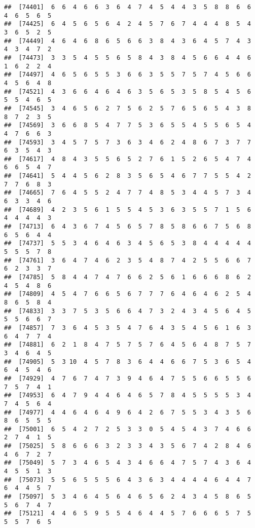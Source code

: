 \documentclass[
]{book}
\begin{document}
\begin{verbatim}
##  [74401]  6  6  4  6  6  3  6  4  7  4  5  4  4  3  5  8  8  6  6  4  6  5  6  5
##  [74425]  6  4  5  6  5  6  4  2  4  5  7  6  7  4  4  4  8  5  4  3  6  5  2  5
##  [74449]  4  6  4  6  8  6  5  6  6  3  8  4  3  6  4  5  7  4  3  4  3  4  7  2
##  [74473]  3  3  5  4  5  5  6  5  8  4  3  8  4  5  6  6  4  4  6  1  6  2  2  4
##  [74497]  4  6  5  6  5  5  3  6  6  3  5  5  7  5  7  4  5  6  6  4  5  6  4  8
##  [74521]  4  3  6  6  4  6  4  6  3  5  6  5  3  5  8  5  4  5  6  5  5  4  6  5
##  [74545]  3  4  6  5  6  2  7  5  6  2  5  7  6  5  6  5  4  3  8  8  7  2  3  5
##  [74569]  3  6  6  8  5  4  7  7  5  3  6  5  5  4  5  5  6  5  4  4  7  6  6  3
##  [74593]  3  4  5  7  5  7  3  6  3  4  6  2  4  8  6  7  3  7  7  6  3  5  4  3
##  [74617]  4  8  4  3  5  5  6  5  2  7  6  1  5  2  6  5  4  7  4  6  6  5  4  7
##  [74641]  5  4  4  5  6  2  8  3  5  6  5  4  6  7  7  5  5  4  2  7  7  6  8  3
##  [74665]  7  6  4  5  5  2  4  7  7  4  8  5  3  4  4  5  7  3  4  6  3  3  4  6
##  [74689]  4  2  3  5  6  1  5  5  4  5  3  6  3  5  5  7  1  5  6  4  4  4  4  3
##  [74713]  6  4  3  6  7  4  5  6  5  7  8  5  8  6  6  7  5  6  8  6  5  6  4  4
##  [74737]  5  5  3  4  6  4  6  3  4  5  6  5  3  8  4  4  4  4  4  5  5  5  7  8
##  [74761]  3  6  4  7  4  6  2  3  5  4  8  7  4  2  5  5  6  6  7  6  2  3  3  7
##  [74785]  5  8  4  4  7  4  7  6  6  2  5  6  1  6  6  6  8  6  2  4  5  4  8  6
##  [74809]  4  5  4  7  6  6  5  6  7  7  7  6  4  6  4  6  2  5  4  8  6  5  8  4
##  [74833]  3  3  7  5  3  5  6  6  4  7  3  2  4  3  4  5  6  4  5  5  5  6  6  7
##  [74857]  7  3  6  4  5  3  5  4  7  6  4  3  5  4  5  6  1  6  3  6  4  7  7  4
##  [74881]  6  2  1  8  4  7  5  7  5  7  6  4  5  6  4  8  7  5  7  3  4  6  4  5
##  [74905]  5  3 10  4  5  7  8  3  6  4  4  6  6  7  5  3  6  5  4  6  4  5  4  6
##  [74929]  4  7  6  7  4  7  3  9  4  6  4  7  5  5  6  6  5  5  6  7  5  7  4  1
##  [74953]  6  4  7  9  4  4  6  4  6  5  7  8  4  5  5  5  5  3  4  7  4  5  6  4
##  [74977]  4  4  6  4  6  4  9  6  4  2  6  7  5  5  3  4  3  5  6  8  6  5  5  5
##  [75001]  6  5  4  2  7  2  5  3  3  0  5  4  5  4  3  7  4  6  6  2  7  4  1  5
##  [75025]  5  8  6  6  6  3  2  3  3  4  3  5  6  7  4  2  8  4  6  4  6  7  2  7
##  [75049]  5  7  3  4  6  5  4  3  4  6  6  4  7  5  7  4  3  6  4  4  5  5  1  3
##  [75073]  5  5  6  5  5  5  6  4  3  6  3  4  4  4  4  6  4  4  7  6  4  4  5  7
##  [75097]  5  3  4  6  4  5  6  4  6  5  6  2  4  3  4  5  8  6  5  5  6  7  4  7
##  [75121]  4  4  6  5  9  5  5  4  6  4  4  5  7  6  6  6  5  7  5  5  5  7  6  5

\end{verbatim}
\end{document}
